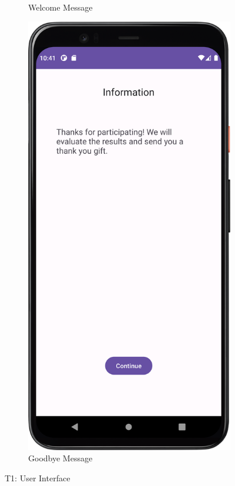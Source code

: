 \begin{figure}[htbp]
\begin{subfigure}[b]{0.25\textwidth}
        \caption{Welcome Message}
        \label{subfig:welcomeMessage}
    \end{subfigure}
    \hspace{1cm}
    \begin{subfigure}[b]{0.25\textwidth}
        \centering
        \includegraphics[width=\textwidth]{content/07_evaluation_of_the_solution/Screenshot_GoodbyeMessage.png}
        \caption{Goodbye Message}
        \label{subfig:goodbyeMessage}
    \end{subfigure}
    \caption{T1: User Interface}
    \label{fig:T1}
\end{figure}

